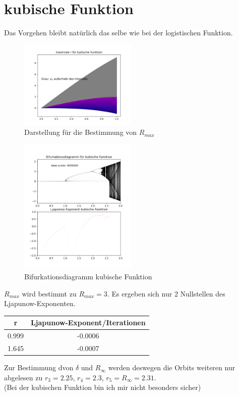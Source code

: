 \section{kubische Funktion}
Das Vorgehen bleibt natürlich das selbe wie bei der logistischen Funktion.\\
\begin{figure} [h]
	\centering
	\includegraphics[width=0.5\textwidth]{Aufgabe1/kubicMaxR.png}
	\caption{Darstellung für die Bestimmung von $R_{max}$}
\end{figure}
\begin{figure} [h]
	\centering
	\includegraphics[width=0.5\textwidth]{Aufgabe1/kubic.png}
	\caption{Bifurkationsdiagramm kubische Funktion}
\end{figure}
$R_{max}$ wird bestimmt zu $R_{max} = 3$. Es ergeben sich nur 2 Nullstellen des Ljapunow-Exponenten.\\
\begin{center}
\begin{tabular}{cc}
\toprule
r & Ljapunow-Exponent/Iterationen \\
\midrule
0.999 & -0.0006\\
1.645 & -0.0007\\
\bottomrule
\end{tabular}
\end{center}
Zur Bestimmung dvon $\delta$ und $R_{\infty}$ werden deswegen die Orbits weiteren nur abgelesen zu $r_3 = 2.25$, $r_4 = 2.3$, $r_5 = R_{\infty} = 2.31$. \\
(Bei der kubischen Funktion bin ich mir nicht besonders sicher)
